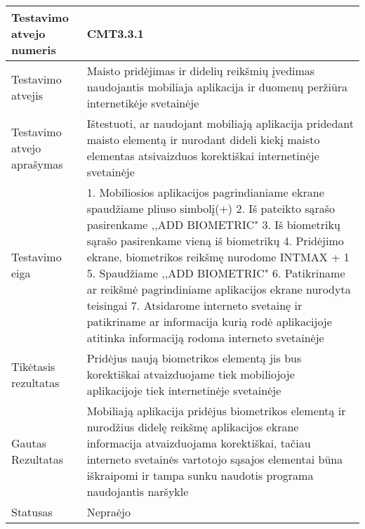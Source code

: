 \documentclass[oneside]{VUMIFPSkursinis}
\begin{document}
\begin{center}
    \begin{tabular}{ |p{5cm}|p{13cm}|}
    \hline
    	Testavimo atvejo numeris & CMT3.3.1\\ \hline
    	Testavimo atvejis & Maisto pridėjimas ir didelių reikšmių įvedimas naudojantis mobiliaja aplikacija ir duomenų peržiūra internetikėje svetainėje \\ \hline
	Testavimo atvejo aprašymas &Ištestuoti, ar naudojant mobiliają aplikacija pridedant maisto elementą ir nurodant dideli kiekį maisto elementas atsivaizduos korektiškai internetinėje svetainėje   \\ \hline
	Testavimo eiga & 1. Mobiliosios aplikacijos pagrindianiame ekrane spaudžiame pliuso simbolį(+)
				2. Iš pateikto sąrašo pasirenkame ,,ADD BIOMETRIC"
				3. Iš biometrikų sąrašo pasirenkame vieną iš biometrikų
				4. Pridėjimo ekrane, biometrikos reikšmę nurodome INTMAX + 1
				5. Spaudžiame ,,ADD BIOMETRIC"
				6. Patikriname ar reikšmė pagrindiniame aplikacijos ekrane nurodyta teisingai
				7. Atsidarome interneto svetainę ir patikriname ar informacija kurią rodė aplikacijoje atitinka informaciją rodoma interneto svetainėje \\ \hline
	Tikėtasis rezultatas &  Pridėjus naują biometrikos elementą jis bus korektiškai atvaizduojame tiek mobiliojoje aplikacijoje tiek internetinėje svetainėje\\ \hline
	Gautas Rezultatas & Mobiliają aplikacija pridėjus biometrikos elementą ir nurodžius didelę reikšmę aplikacijos ekrane informacija atvaizduojama korektiškai, tačiau interneto svetainės vartotojo sąsajos elementai būna iškraipomi ir tampa sunku naudotis programa naudojantis naršykle  \\ \hline
	Statusas &  Nepraėjo\\ \hline
    \hline
    \end{tabular}
\end{center}

\iffalse XXXXXXXXXXXXXXXXXXXXXXXXXXXXXXXXXXXXXXXXXXXXXXXXXXXXXXXXXXXXXXXXXXXXXXXXXXXXXXXXXXXXXXXXXXXXXXXXXXXXXXXXXXXXXXXXXXXXXXXXXXXXXXXXXXXXXXX \fi
\end{document}
